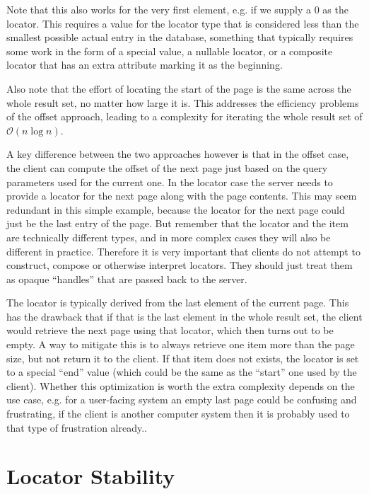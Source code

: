 \documentclass[11pt,a4paper]{article}
\begin{document}
\begin{multicols}{2}
Note that this also works for the very first element, e.g. if we supply a 0 as
the locator. This requires a value for the locator type that is considered less
than the smallest possible actual entry in the database, something that
typically requires some work in the form of a special value, a nullable locator,
or a composite locator that has an extra attribute marking it as the beginning.

Also note that the effort of locating the start of the page is the same across
the whole result set, no matter how large it is. This addresses the efficiency
problems of the offset approach, leading to a complexity for iterating the whole
result set of $\mathcal{O}(n\log{}n)$.

A key difference between the two approaches however is that in the offset case,
the client can compute the offset of the next page just based on the query
parameters used for the current one. In the locator case the server needs to
provide a locator for the next page along with the page contents. This may seem
redundant in this simple example, because the locator for the next page could
just be the last entry of the page. But remember that the locator and the item 
are technically different types, and in more complex cases they will also be
different in practice. Therefore it is very important that clients do not
attempt to construct, compose or otherwise interpret locators. They should just
treat them as opaque ``handles'' that are passed back to the server.

The locator is typically derived from the last element of the current page. 
This has the drawback that if that is the last element in the whole result set,
the client would retrieve the next page using that locator, which then turns out to be empty. A way to
mitigate this is to always retrieve one item more than the page size, but not
return it to the client. If that item does not exists, the locator is set to a
special ``end'' value (which could be the same as the ``start'' one used by the
client). Whether this optimization is worth the extra complexity depends on the
use case, e.g. for a user-facing system an empty last page could be confusing
and frustrating, if the client is another computer system then it is probably
used to that type of frustration already..

\section*{Locator Stability}


\end{multicols}
\end{document}
